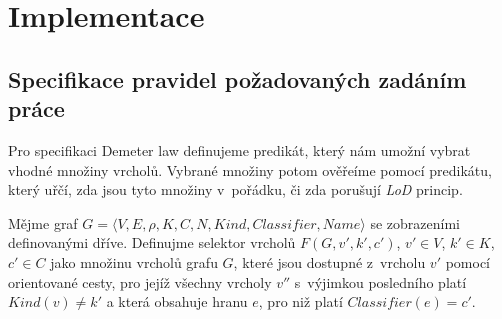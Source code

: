 \chapter{Implementace}







\section{Specifikace pravidel požadovaných zadáním práce}
Pro specifikaci Demeter law definujeme predikát, který nám umožní vybrat vhodné množiny vrcholů. Vybrané množiny potom ověřeíme pomocí predikátu, který uřčí, zda jsou tyto množiny v~pořádku, či zda porušují \emph{LoD} princip.

\begin{definition}
Mějme graf $G = \langle V, E, \rho, K, C, N, \mathit{Kind}, \mathit{Classifier}, \mathit{Name}\rangle$ se zobrazeními definovanými dříve. Definujme selektor vrcholů $F(G, v', k', c')$, $v' \in V$, $k' \in K$, $c' \in C$ jako množinu vrcholů grafu $G$, které jsou dostupné z~vrcholu $v'$ pomocí orientované cesty, pro jejíž všechny vrcholy $v''$ s~výjimkou posledního platí $Kind(v) \ne k'$ a která obsahuje hranu $e$, pro niž platí $Classifier(e) = c' $.
\end{definition}

